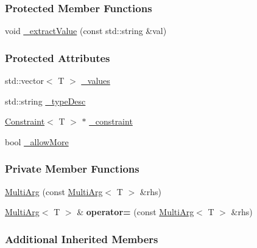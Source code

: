 \subsubsection*{Protected Member Functions}
\begin{DoxyCompactItemize}
\item 
void \hyperlink{classTCLAP_1_1MultiArg_a26cbf5e86ac66d876f9285f1fda22470}{\+\_\+extract\+Value} (const std\+::string \&val)
\end{DoxyCompactItemize}
\subsubsection*{Protected Attributes}
\begin{DoxyCompactItemize}
\item 
std\+::vector$<$ T $>$ \hyperlink{classTCLAP_1_1MultiArg_aabcab153e09608343713a6ffef431783}{\+\_\+values}
\item 
std\+::string \hyperlink{classTCLAP_1_1MultiArg_a0f6a2b04fe15d1ede95165fc6e1949e8}{\+\_\+type\+Desc}
\item 
\hyperlink{classTCLAP_1_1Constraint}{Constraint}$<$ T $>$ $\ast$ \hyperlink{classTCLAP_1_1MultiArg_afc754048b66bc3a251268947273ea906}{\+\_\+constraint}
\item 
bool \hyperlink{classTCLAP_1_1MultiArg_a93a3ef586f763d46839c0e737689b85f}{\+\_\+allow\+More}
\end{DoxyCompactItemize}
\subsubsection*{Private Member Functions}
\begin{DoxyCompactItemize}
\item 
\hyperlink{classTCLAP_1_1MultiArg_afee487984c8a7a3bdb5221cfd0bd9e51}{Multi\+Arg} (const \hyperlink{classTCLAP_1_1MultiArg}{Multi\+Arg}$<$ T $>$ \&rhs)
\item 
\hyperlink{classTCLAP_1_1MultiArg}{Multi\+Arg}$<$ T $>$ \& {\bfseries operator=} (const \hyperlink{classTCLAP_1_1MultiArg}{Multi\+Arg}$<$ T $>$ \&rhs)\hypertarget{classTCLAP_1_1MultiArg_a1f1eec634dac18c948124ef580cc972f}{}\label{classTCLAP_1_1MultiArg_a1f1eec634dac18c948124ef580cc972f}

\end{DoxyCompactItemize}
\subsubsection*{Additional Inherited Members}



